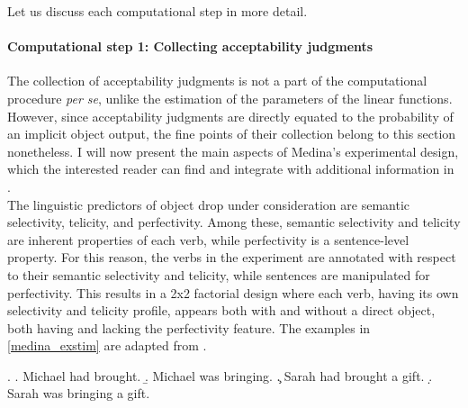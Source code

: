 Let us discuss each computational step in more detail.

\paragraph{Computational step 1: Collecting acceptability judgments} The collection of acceptability judgments is not a part of the computational procedure \textit{per se}, unlike the estimation of the parameters of the linear functions. However, since acceptability judgments are directly equated to the probability of an implicit object output, the fine points of their collection belong to this section nonetheless. I will now present the main aspects of Medina's experimental design, which the interested reader can find and integrate with additional information in \textcite[110-134]{Medina2007}.\\
The linguistic predictors of object drop under consideration are semantic selectivity, telicity, and perfectivity. Among these, semantic selectivity and telicity are inherent properties of each verb, while perfectivity is a sentence-level property. For this reason, the verbs in the experiment are annotated with respect to their semantic selectivity and telicity, while sentences are manipulated for perfectivity. This results in a 2x2 factorial design where each verb, having its own selectivity and telicity profile, appears both with and without a direct object, both having and lacking the perfectivity feature. The examples in \ref{medina_exstim} are adapted from \textcite[113]{Medina2007}.

\ex. \label{medina_exstim} \a. \label{medina_exstim1} Michael had brought.
\b. \label{medina_exstim2}  Michael was bringing.
\c. \label{medina_exstim3}  Sarah had brought a gift.
\d. \label{medina_exstim4}  Sarah was bringing a gift.

